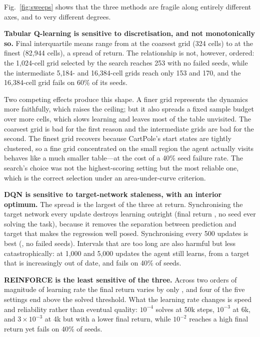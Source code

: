 \documentclass[conference]{IEEEtran}
\begin{document}
Fig.~\ref{fig:sweeps} shows that the three methods are fragile along entirely
different axes, and to very different degrees.

\textbf{Tabular Q-learning is sensitive to discretisation, and not monotonically
so.} Final interquartile means range from \TabSweepWorstValue{} at the coarsest
grid (324 cells) to \TabSweepBestValue{} at the finest (82{,}944 cells), a spread
of \TabSweepSpread{} return. The relationship is not, however, ordered: the
1{,}024-cell grid selected by the search reaches 253 with no failed seeds, while
the intermediate 5{,}184- and 16{,}384-cell grids reach only 153 and 170, and the
16{,}384-cell grid fails on 60\% of its seeds.

Two competing effects produce this shape. A finer grid represents the dynamics
more faithfully, which raises the ceiling; but it also spreads a fixed sample
budget over more cells, which slows learning and leaves most of the table
unvisited. The coarsest grid is bad for the first reason and the intermediate
grids are bad for the second. The finest grid recovers because CartPole's start
states are tightly clustered, so a fine grid concentrated on the small region the
agent actually visits behaves like a much smaller table---at the cost of a 40\%
seed failure rate. The search's choice was not the highest-scoring setting but the
most reliable one, which is the correct selection under an area-under-curve
criterion.

\textbf{DQN is sensitive to target-network staleness, with an interior optimum.}
The spread is the largest of the three at \DqnSweepSpread{} return. Synchronising
the target network every update destroys learning outright (final return
\DqnSweepWorstValue{}, no seed ever solving the task), because it removes the
separation between prediction and target that makes the regression well posed.
Synchronising every 500 updates is best (\DqnSweepBestValue{}, no failed seeds).
Intervals that are too long are also harmful but less catastrophically: at 1{,}000
and 5{,}000 updates the agent still learns, from a target that is increasingly out
of date, and fails on 40\% of seeds.

\textbf{REINFORCE is the least sensitive of the three.} Across two orders of
magnitude of learning rate the final return varies by only \ReiSweepSpread{}, and
four of the five settings end above the solved threshold. What the learning rate
changes is speed and reliability rather than eventual quality: $10^{-4}$ solves at
50k steps, $10^{-3}$ at 6k, and $3\times10^{-3}$ at 4k but with a lower final
return, while $10^{-2}$ reaches a high final return yet fails on 40\% of seeds.
\end{document}
